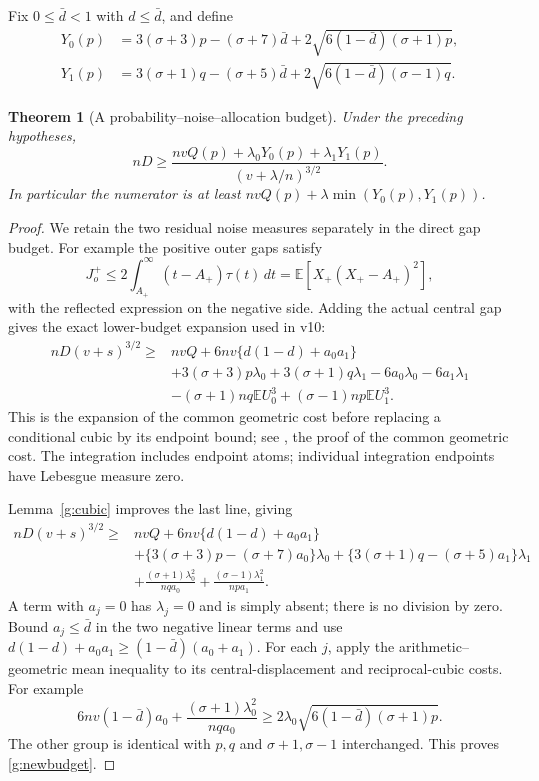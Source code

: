 \documentclass[11pt]{article}
\newcommand{\E}{\mathbb E}\newcommand{\Pp}{\mathbb P}
\newtheorem{theorem}{Theorem}\newtheorem{lemma}[theorem]{Lemma}
\begin{document}
Fix $0\le\bar d<1$ with $d\le\bar d$, and define
\begin{align*}
 Y_0(p)&=3(\sigma+3)p-(\sigma+7)\bar d
       +2\sqrt{6(1-\bar d)(\sigma+1)p},\\
 Y_1(p)&=3(\sigma+1)q-(\sigma+5)\bar d
       +2\sqrt{6(1-\bar d)(\sigma-1)q}.
\end{align*}

\begin{theorem}[A probability--noise--allocation budget]\label{g:budget}
Under the preceding hypotheses,
\begin{equation}\label{g:newbudget}
 nD\ge\frac{nvQ(p)+\lambda_0Y_0(p)+\lambda_1Y_1(p)}
                    {(v+\lambda/n)^{3/2}}.
\end{equation}
In particular the numerator is at least
$nvQ(p)+\lambda\min(Y_0(p),Y_1(p))$.
\end{theorem}
\begin{proof}
We retain the two residual noise measures separately in the direct gap
budget. For example the positive outer gaps satisfy
\[
 J_o^+\le2\int_{A_+}^{\infty}(t-A_+)\tau(t)\,dt
       =\E[X_+(X_+-A_+)^2],
\]
with the reflected expression on the negative side. Adding the actual
central gap gives the exact lower-budget expansion used in v10:
\begin{align*}
 nD(v+s)^{3/2}\ge{}&nvQ+6nv\{d(1-d)+a_0a_1\}\\
 &+3(\sigma+3)p\lambda_0+3(\sigma+1)q\lambda_1
       -6a_0\lambda_0-6a_1\lambda_1\\
 &-(\sigma+1)nq\E U_0^3+(\sigma-1)np\E U_1^3.
\end{align*}
This is the expansion of the common geometric cost before replacing a
conditional cubic by its endpoint bound; see
,
the proof of the common geometric cost. The integration includes endpoint atoms;
individual integration endpoints have Lebesgue measure zero.

Lemma~\ref{g:cubic} improves the last line, giving
\begin{align*}
 nD(v+s)^{3/2}\ge{}&nvQ+6nv\{d(1-d)+a_0a_1\}\\
 &+\{3(\sigma+3)p-(\sigma+7)a_0\}\lambda_0
  +\{3(\sigma+1)q-(\sigma+5)a_1\}\lambda_1\\
 &+\frac{(\sigma+1)\lambda_0^2}{nqa_0}
  +\frac{(\sigma-1)\lambda_1^2}{npa_1}.
\end{align*}
A term with $a_j=0$ has $\lambda_j=0$ and is simply absent;
there is no division by zero. Bound $a_j\le\bar d$ in the two negative
linear terms and use
$d(1-d)+a_0a_1\ge(1-\bar d)(a_0+a_1)$.
For each $j$, apply the arithmetic--geometric mean inequality to its
central-displacement and reciprocal-cubic costs. For example
\[
 6nv(1-\bar d)a_0+
       \frac{(\sigma+1)\lambda_0^2}{nqa_0}
 \ge2\lambda_0\sqrt{6(1-\bar d)(\sigma+1)p}.
\]
The other group is identical with $p,q$ and $\sigma+1,\sigma-1$
interchanged. This proves \eqref{g:newbudget}.
\end{proof}
\end{document}
